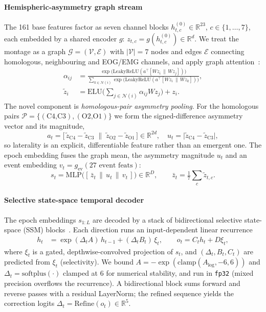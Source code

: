 \documentclass[journal]{IEEEtran}
\begin{document}
\paragraph{Hemispheric-asymmetry graph stream}
The 161 base features factor as seven channel blocks
$h^{(0)}_{t,c}\in\mathbb{R}^{23}$, $c\in\{1,\dots,7\}$, each embedded by a shared
encoder $g$: $z_{t,c}=g(h^{(0)}_{t,c})\in\mathbb{R}^{d}$. We treat the montage as a
graph $\mathcal{G}=(\mathcal{V},\mathcal{E})$ with $|\mathcal{V}|=7$ nodes and edges
$\mathcal{E}$ connecting homologous, neighbouring and EOG/EMG channels, and apply
graph attention~\cite{velickovic2018gat}:
\begin{align}
\alpha_{ij} &= \frac{\exp\!\big(\mathrm{LeakyReLU}(a^{\!\top}[Wz_i\,\|\,Wz_j])\big)}
{\sum_{k\in\mathcal{N}(i)}\exp\!\big(\mathrm{LeakyReLU}(a^{\!\top}[Wz_i\,\|\,Wz_k])\big)},\\
\tilde z_i &= \mathrm{ELU}\!\Big(\textstyle\sum_{j\in\mathcal{N}(i)}\alpha_{ij}Wz_j\Big)+z_i .
\end{align}
The novel component is \emph{homologous-pair asymmetry pooling}. For the homologous
pairs $\mathcal{P}=\{(\text{C4,C3}),(\text{O2,O1})\}$ we form the signed-difference
asymmetry vector and its magnitude,
\begin{equation}
\label{eq:asym}
a_t=\big[\,\tilde z_{\mathrm{C4}}-\tilde z_{\mathrm{C3}}\;\big\|\;
\tilde z_{\mathrm{O2}}-\tilde z_{\mathrm{O1}}\,\big]\in\mathbb{R}^{2d},\quad
u_t=\lvert \tilde z_{\mathrm{C4}}-\tilde z_{\mathrm{C3}}\rvert,
\end{equation}
so laterality is an explicit, differentiable feature rather than an emergent one.
The epoch embedding fuses the graph mean, the asymmetry magnitude $u_t$ and an
event embedding $v_t=g_{\mathrm{ev}}(\text{27 event feats})$:
\begin{equation}
s_t=\mathrm{MLP}\!\big([\,\bar z_t \,\|\, u_t \,\|\, v_t\,]\big)\in\mathbb{R}^{D},
\qquad \bar z_t=\tfrac{1}{7}\textstyle\sum_c \tilde z_{t,c}.
\end{equation}

\paragraph{Selective state-space temporal decoder}
The epoch embeddings $s_{1:L}$ are decoded by a stack of bidirectional selective
state-space (SSM) blocks~\cite{gu2023mamba}. Each direction runs an input-dependent
linear recurrence
\begin{align}
h_t &= \exp(\Delta_t A)\,h_{t-1}+(\Delta_t B_t)\,\xi_t, \qquad o_t=C_t h_t + D\xi_t,
\end{align}
where $\xi_t$ is a gated, depthwise-convolved projection of $s_t$, and
$(\Delta_t,B_t,C_t)$ are predicted from $\xi_t$ (selectivity). We bound
$A=-\exp(\mathrm{clamp}(A_{\log},-6,6))$ and $\Delta_t=\mathrm{softplus}(\cdot)$
clamped at $6$ for numerical stability, and run in \texttt{fp32} (mixed precision
overflows the recurrence). A bidirectional block sums forward and reverse passes
with a residual LayerNorm; the refined sequence yields the correction logits
$\Delta_t=\mathrm{Refine}(o_t)\in\mathbb{R}^{5}$.
\end{document}
